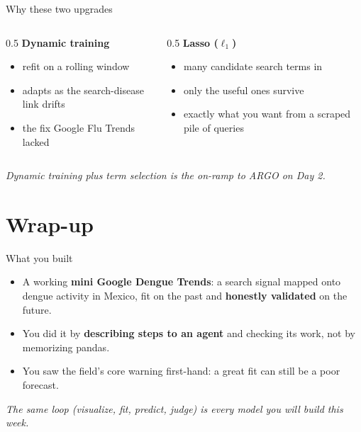 \documentclass[aspectratio=169,11pt]{beamer}
\begin{document}
\begin{frame}{Why these two upgrades}
  \begin{columns}[T]
    \begin{column}{0.5\textwidth}
      \textbf{Dynamic training}
      \begin{itemize}
        \item refit on a rolling window
        \item adapts as the search-disease link drifts
        \item the fix Google Flu Trends lacked
      \end{itemize}
    \end{column}
    \begin{column}{0.5\textwidth}
      \textbf{Lasso ($\ell_1$)}
      \begin{itemize}
        \item many candidate search terms in
        \item only the useful ones survive
        \item exactly what you want from a scraped pile of queries
      \end{itemize}
    \end{column}
  \end{columns}
  \vfill
  \begin{center}
    \itshape Dynamic training plus term selection is the on-ramp to ARGO on Day 2.
  \end{center}
\end{frame}

\section{Wrap-up}

\begin{frame}{What you built}
  \begin{itemize}
    \item A working \textbf{mini Google Dengue Trends}: a search signal mapped onto dengue
          activity in Mexico, fit on the past and \textbf{honestly validated} on the future.
    \item You did it by \textbf{describing steps to an agent} and checking its work, not by
          memorizing pandas.
    \item You saw the field's core warning first-hand: a great fit can still be a poor
          forecast.
  \end{itemize}
  \vspace{0.3em}
  \begin{center}
    \itshape The same loop (visualize, fit, predict, judge) is every model you will build
    this week.
  \end{center}
\end{frame}
\end{document}

